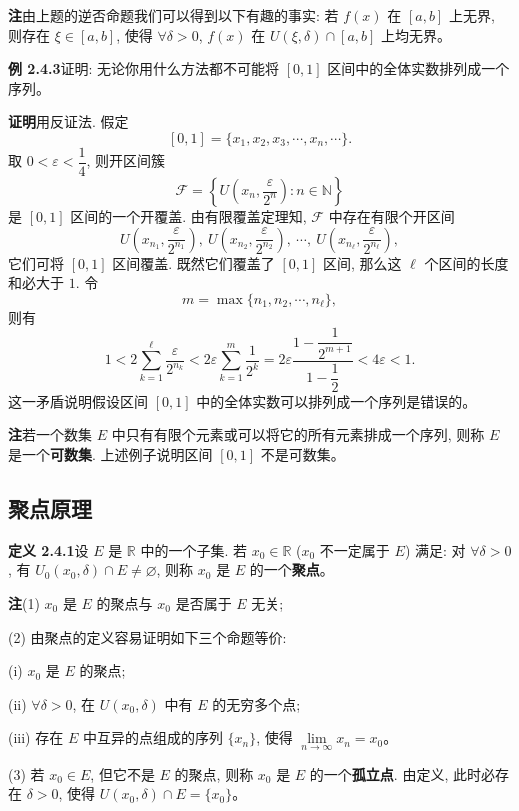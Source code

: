 \documentclass[UTF8, 12pt, fontset=fandol, oneside]{ctexart}
\begin{document}
\noindent\textbf{注}\quad 由上题的逆否命题我们可以得到以下有趣的事实: 若 $f(x)$ 在 $[a,b]$ 上无界, 则存在 $\xi\in[a,b]$, 使得 $\forall\delta>0$, $f(x)$ 在 $U(\xi,\delta)\cap[a,b]$ 上均无界。

\noindent\textbf{例 2.4.3}\quad 证明: 无论你用什么方法都不可能将 $[0,1]$ 区间中的全体实数排列成一个序列。

\noindent\textbf{证明}\quad 用反证法. 假定
\[
  [0,1]=\{x_1,x_2,x_3,\cdots,x_n,\cdots\}.
\]
取 $0<\varepsilon<\dfrac14$, 则开区间簇
\[
  \mathcal{F}=\left\{U\left(x_n,\frac{\varepsilon}{2^n}\right):n\in\mathbb{N}\right\}
\]
是 $[0,1]$ 区间的一个开覆盖. 由有限覆盖定理知, $\mathcal{F}$ 中存在有限个开区间
\[
  U\left(x_{n_1},\frac{\varepsilon}{2^{n_1}}\right),\
  U\left(x_{n_2},\frac{\varepsilon}{2^{n_2}}\right),\
  \cdots,\
  U\left(x_{n_\ell},\frac{\varepsilon}{2^{n_\ell}}\right),
\]
它们可将 $[0,1]$ 区间覆盖. 既然它们覆盖了 $[0,1]$ 区间, 那么这 $\ell$ 个区间的长度和必大于 $1$. 令
\[
  m=\max\{n_1,n_2,\cdots,n_\ell\},
\]
则有
\[
  1<
  2\sum_{k=1}^{\ell}\frac{\varepsilon}{2^{n_k}}
  <
  2\varepsilon\sum_{k=1}^m\frac1{2^k}
  =
  2\varepsilon\frac{1-\dfrac1{2^{m+1}}}{1-\dfrac12}
  <
  4\varepsilon<1.
\]
这一矛盾说明假设区间 $[0,1]$ 中的全体实数可以排列成一个序列是错误的。

\noindent\textbf{注}\quad 若一个数集 $E$ 中只有有限个元素或可以将它的所有元素排成一个序列, 则称 $E$ 是一个\textbf{可数集}. 上述例子说明区间 $[0,1]$ 不是可数集。

\subsection{聚点原理}

\noindent\textbf{定义 2.4.1}\quad 设 $E$ 是 $\mathbb{R}$ 中的一个子集. 若 $x_0\in\mathbb{R}$ ($x_0$ 不一定属于 $E$) 满足: 对 $\forall\delta>0$, 有 $U_0(x_0,\delta)\cap E\ne\varnothing$, 则称 $x_0$ 是 $E$ 的一个\textbf{聚点}。

\noindent\textbf{注}\quad (1) $x_0$ 是 $E$ 的聚点与 $x_0$ 是否属于 $E$ 无关;

(2) 由聚点的定义容易证明如下三个命题等价:

(i) $x_0$ 是 $E$ 的聚点;

(ii) $\forall\delta>0$, 在 $U(x_0,\delta)$ 中有 $E$ 的无穷多个点;

(iii) 存在 $E$ 中互异的点组成的序列 $\{x_n\}$, 使得 $\lim\limits_{n\to\infty}x_n=x_0$。

(3) 若 $x_0\in E$, 但它不是 $E$ 的聚点, 则称 $x_0$ 是 $E$ 的一个\textbf{孤立点}. 由定义, 此时必存在 $\delta>0$, 使得 $U(x_0,\delta)\cap E=\{x_0\}$。
\end{document}
